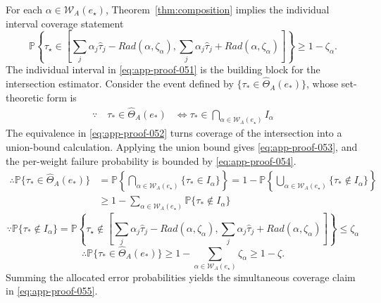 \documentclass[11pt]{article}
\numberwithin{equation}{section}
\newcommand{\Pbb}{\mathbb P}
\newcommand{\1}{\mathbf 1}
\newcommand{\cW}{\mathcal W}
\begin{document}
For each \(\alpha\in\cW_A(e_\star)\), Theorem~\ref{thm:composition} implies
the individual interval coverage statement
\begin{equation}
\label{eq:app-proof-051}
\Pbb\left\{
  \tau_\star
  \in
  \left[
  \sum_j\alpha_j\widehat\tau_j-Rad(\alpha,\zeta_\alpha),
  \sum_j\alpha_j\widehat\tau_j+Rad(\alpha,\zeta_\alpha)
  \right]
  \right\}
  \ge1-\zeta_\alpha.
\end{equation}
The individual interval in \eqref{eq:app-proof-051} is the building block for the
intersection estimator.  Consider the event defined by
\(\{\tau_*\in\widehat\Theta_A(e_*)\}\), whose set-theoretic form is
\begin{equation}
\label{eq:app-proof-052}
\begin{aligned}
\because\quad
\tau_*\in\widehat\Theta_A(e_*)
&\Longleftrightarrow
\tau_*\in\bigcap_{\alpha\in \cW_A(e_\star)}I_\alpha
\end{aligned}
\end{equation}
The equivalence in \eqref{eq:app-proof-052} turns coverage of the
intersection into a union-bound calculation.  Applying the union bound gives
\eqref{eq:app-proof-053}, and the per-weight failure probability is bounded
by \eqref{eq:app-proof-054}.
\begin{equation}
\label{eq:app-proof-053}
\begin{aligned}
\therefore
\mathbb P\{\tau_*\in\widehat\Theta_A(e_*)\}
&=
\mathbb P\left\{
\bigcap_{\alpha\in \cW_A(e_\star)}
\{\tau_*\in I_\alpha\}
\right\}
=1-
\mathbb P\left\{
\bigcup_{\alpha\in \cW_A(e_\star)}
\{\tau_*\notin I_\alpha\}
\right\}\\
&
\ge
1-\sum_{\alpha\in \cW_A(e_\star)}
\mathbb P\{\tau_*\notin I_\alpha\}
\end{aligned}
\end{equation}
\begin{equation}
\label{eq:app-proof-054}
\because\mathbb P\{\tau_*\notin I_\alpha\}=
\Pbb\left\{
  \tau_\star
  \notin
  \left[
  \sum_j\alpha_j\widehat\tau_j-Rad(\alpha,\zeta_\alpha),
  \sum_j\alpha_j\widehat\tau_j+Rad(\alpha,\zeta_\alpha)
  \right]
  \right\}
  \le\zeta_\alpha
\end{equation}
\begin{equation}
\label{eq:app-proof-055}
\therefore\mathbb P\{\tau_*\in\widehat\Theta_A(e_*)\}\ge1-\sum_{\alpha\in \cW_A(e_\star)}\zeta_\alpha\ge1-\zeta.
\end{equation}
Summing the allocated error probabilities yields the simultaneous coverage
claim in \eqref{eq:app-proof-055}.
\end{document}
